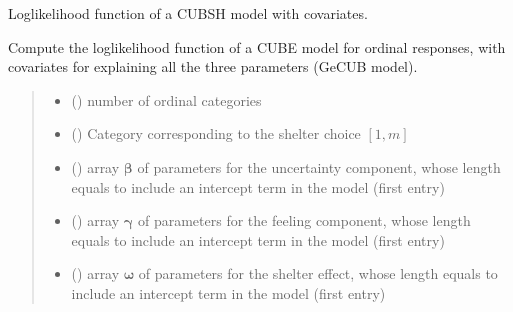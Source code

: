 \documentclass[letterpaper,10pt,english]{sphinxmanual}
\begin{document}
\begin{fulllineitems}
\label{\detokenize{cubmods:cubmods.cubsh_ywx.loglik}}
\pysigstartsignatures
{}
\pysigstopsignatures
\sphinxAtStartPar
Log\sphinxhyphen{}likelihood function of a CUBSH model with covariates.

\sphinxAtStartPar
Compute the log\sphinxhyphen{}likelihood function of a CUBE model for ordinal responses,
with covariates for explaining all the three parameters (GeCUB model).
\begin{quote}\begin{description}
\begin{itemize}
\item {} 
\sphinxAtStartPar
{} () \textendash{} number of ordinal categories

\item {} 
\sphinxAtStartPar
{} () \textendash{} Category corresponding to the shelter choice \([1,m]\)

\item {} 
\sphinxAtStartPar
{} () \textendash{} array \(\pmb \beta\) of parameters for the uncertainty component, whose length equals 
 to include an intercept term in the model (first entry)

\item {} 
\sphinxAtStartPar
{} () \textendash{} array \(\pmb \gamma\) of parameters for the feeling component, whose length equals 
 to include an intercept term in the model (first entry)

\item {} 
\sphinxAtStartPar
{} () \textendash{} array \(\pmb \omega\) of parameters for the shelter effect, whose length equals 
 to include an intercept term in the model (first entry)


\end{itemize}
\end{description}
\end{quote}
\end{fulllineitems}
\end{document}
